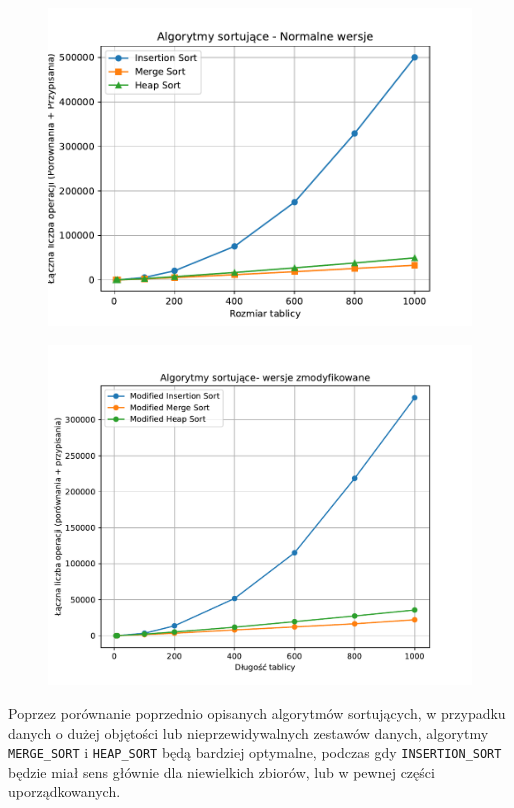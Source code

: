 \documentclass{article}
\begin{document}
\begin{enumerate}
\begin{figure}[H]
	\centering
	\includegraphics[width=1\textwidth]{Figure_4.pdf}
\end{figure}
\begin{figure}[H]
	\centering
	\includegraphics[width=1\textwidth]{Figure_5.1.pdf}
\end{figure}
\end{enumerate}
Poprzez porównanie poprzednio opisanych algorytmów sortujących,  w przypadku danych o dużej objętości lub nieprzewidywalnych zestawów danych, algorytmy \texttt{MERGE\_SORT} i \texttt{HEAP\_SORT} będą bardziej optymalne, podczas gdy \texttt{INSERTION\_SORT} będzie miał sens głównie dla niewielkich zbiorów, lub w pewnej części uporządkowanych.
\end{document}
